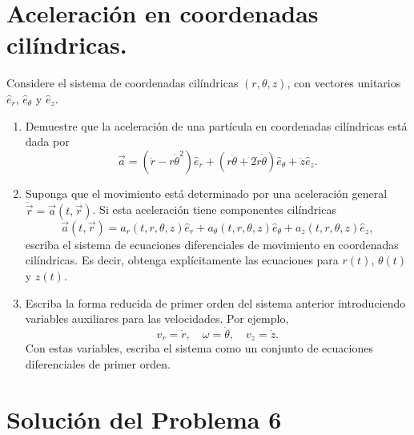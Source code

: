 \documentclass[12pt, a4paper]{article}
\begin{document}
\section{Aceleración en coordenadas cilíndricas.} Considere el sistema de coordenadas cilíndricas $(r, \theta, z)$, con vectores unitarios $\hat{e}_r$, $\hat{e}_\theta$ y $\hat{e}_z$.
\begin{enumerate}
    \item[a)] Demuestre que la aceleración de una partícula en coordenadas cilíndricas está dada por
    $$\vec{a} = (\ddot{r} - r\dot{\theta}^2)\hat{e}_r + (r\ddot{\theta} + 2\dot{r}\dot{\theta})\hat{e}_\theta + \ddot{z}\hat{e}_z.$$
    \item[b)] Suponga que el movimiento está determinado por una aceleración general $\ddot{\vec{r}} = \vec{a}(t, \vec{r})$. Si esta aceleración tiene componentes cilíndricas
    $$\vec{a}(t, \vec{r}) = a_r(t, r, \theta, z)\hat{e}_r + a_\theta(t, r, \theta, z)\hat{e}_\theta + a_z(t, r, \theta, z)\hat{e}_z,$$
    escriba el sistema de ecuaciones diferenciales de movimiento en coordenadas cilíndricas. Es decir, obtenga explícitamente las ecuaciones para $r(t)$, $\theta(t)$ y $z(t)$.
    \item[c)] Escriba la forma reducida de primer orden del sistema anterior introduciendo variables auxiliares para las velocidades. Por ejemplo,
    $$v_r = \dot{r}, \quad \omega = \dot{\theta}, \quad v_z = \dot{z}.$$
    Con estas variables, escriba el sistema como un conjunto de ecuaciones diferenciales de primer orden.
\end{enumerate}

\section*{Solución del Problema 6}
\end{document}
